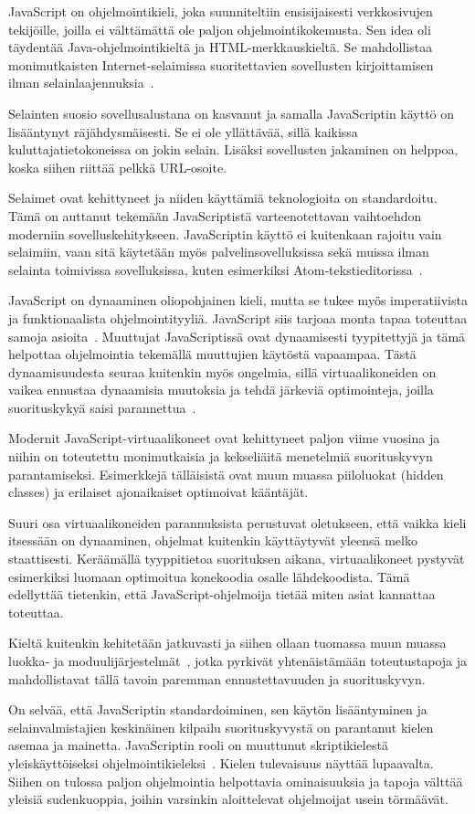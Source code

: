 \noindent
JavaScript on ohjelmointikieli, joka suunniteltiin ensisijaisesti verkkosivujen tekijöille, joilla ei välttämättä ole paljon ohjelmointikokemusta. Sen idea oli täydentää Java-ohjelmointikieltä ja HTML-merkkauskieltä. Se mahdollistaa monimutkaisten Internet-selaimissa suoritettavien sovellusten kirjoittamisen ilman selainlaajennuksia~\cite{paolini1994netscape}.

Selainten suosio sovellusalustana on kasvanut ja samalla JavaScriptin käyttö on lisääntynyt räjähdysmäisesti. Se ei ole yllättävää, sillä kaikissa kuluttajatietokoneissa on jokin selain. Lisäksi sovellusten jakaminen on helppoa, koska siihen riittää pelkkä URL-osoite.

Selaimet ovat kehittyneet ja niiden käyttämiä teknologioita on standardoitu. Tämä on auttanut tekemään JavaScriptistä varteenotettavan vaihtoehdon moderniin sovelluskehitykseen. JavaScriptin käyttö ei kuitenkaan rajoitu vain selaimiin, vaan sitä käytetään myös palvelinsovelluksissa sekä muissa ilman selainta toimivissa sovelluksissa, kuten esimerkiksi Atom-tekstieditorissa~\cite{atom}.

JavaScript on dynaaminen oliopohjainen kieli, mutta se tukee myös imperatiivista ja funktionaalista ohjelmointityyliä. JavaScript siis tarjoaa monta tapaa toteuttaa samoja asioita~\cite[Osio 4.2.1.]{es6}. Muuttujat JavaScriptissä ovat dynaamisesti tyypitettyjä ja tämä helpottaa ohjelmointia tekemällä muuttujien käytöstä vapaampaa. Tästä dynaamisuudesta seuraa kuitenkin myös ongelmia, sillä virtuaalikoneiden on vaikea ennustaa dynaamisia muutoksia ja tehdä järkeviä optimointeja, joilla suorituskykyä saisi parannettua~\cite{Ahn2014}.

Modernit JavaScript-virtuaalikoneet ovat kehittyneet paljon viime vuosina ja niihin on toteutettu monimutkaisia ja kekseliäitä menetelmiä suorituskyvyn parantamiseksi. Esimerkkejä tälläisistä ovat muun muassa piiloluokat (hidden classes) ja erilaiset ajonaikaiset optimoivat kääntäjät.

Suuri osa virtuaalikoneiden parannuksista perustuvat oletukseen, että vaikka kieli itsessään on dynaaminen, ohjelmat kuitenkin käyttäytyvät yleensä melko staattisesti. Keräämällä tyyppitietoa suorituksen aikana, virtuaalikoneet pystyvät esimerkiksi luomaan optimoitua konekoodia osalle lähdekoodista. Tämä edellyttää tietenkin, että JavaScript-ohjelmoija tietää miten asiat kannattaa toteuttaa.

Kieltä kuitenkin kehitetään jatkuvasti ja siihen ollaan tuomassa muun muassa luokka- ja moduulijärjestelmät~\cite[Osiot~14.5.~ja~15.2.]{es6}, jotka pyrkivät yhtenäistämään toteutustapoja ja mahdollistavat tällä tavoin paremman ennustettavuuden ja suorituskyvyn.

On selvää, että JavaScriptin standardoiminen, sen käytön lisääntyminen ja selainvalmistajien keskinäinen kilpailu suorituskyvystä on parantanut kielen asemaa ja mainetta. JavaScriptin rooli on muuttunut skriptikielestä yleiskäyttöiseksi ohjelmointikieleksi~\cite[Osio~4.]{es6}. Kielen tulevaisuus näyttää lupaavalta. Siihen on tulossa paljon ohjelmointia helpottavia ominaisuuksia ja tapoja välttää yleisiä sudenkuoppia, joihin varsinkin aloittelevat ohjelmoijat usein törmäävät.